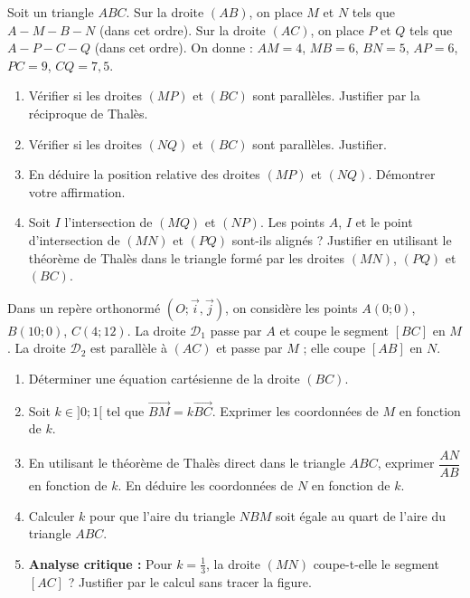 \documentclass[11pt]{article}
\begin{document}
\begin{exercice}
Soit un triangle $ABC$. Sur la droite $(AB)$, on place $M$ et $N$ tels que $A-M-B-N$ (dans cet ordre). Sur la droite $(AC)$, on place $P$ et $Q$ tels que $A-P-C-Q$ (dans cet ordre).
On donne : $AM = 4$, $MB = 6$, $BN = 5$, $AP = 6$, $PC = 9$, $CQ = 7,5$.
\begin{enumerate}
    \item Vérifier si les droites $(MP)$ et $(BC)$ sont parallèles. Justifier par la réciproque de Thalès.
    \item Vérifier si les droites $(NQ)$ et $(BC)$ sont parallèles. Justifier.
    \item En déduire la position relative des droites $(MP)$ et $(NQ)$. Démontrer votre affirmation.
    \item Soit $I$ l'intersection de $(MQ)$ et $(NP)$. Les points $A$, $I$ et le point d'intersection de $(MN)$ et $(PQ)$ sont-ils alignés ? Justifier en utilisant le théorème de Thalès dans le triangle formé par les droites $(MN)$, $(PQ)$ et $(BC)$.
\end{enumerate}
\end{exercice}

\begin{exercice}
Dans un repère orthonormé $(O; \vec{i}, \vec{j})$, on considère les points $A(0;0)$, $B(10;0)$, $C(4;12)$.
La droite $\mathcal{D}_1$ passe par $A$ et coupe le segment $[BC]$ en $M$. La droite $\mathcal{D}_2$ est parallèle à $(AC)$ et passe par $M$ ; elle coupe $[AB]$ en $N$.
\begin{enumerate}
    \item Déterminer une équation cartésienne de la droite $(BC)$.
    \item Soit $k \in ]0;1[$ tel que $\overrightarrow{BM} = k \overrightarrow{BC}$. Exprimer les coordonnées de $M$ en fonction de $k$.
    \item En utilisant le théorème de Thalès direct dans le triangle $ABC$, exprimer $\dfrac{AN}{AB}$ en fonction de $k$. En déduire les coordonnées de $N$ en fonction de $k$.
    \item Calculer $k$ pour que l'aire du triangle $NBM$ soit égale au quart de l'aire du triangle $ABC$.
    \item \textbf{Analyse critique :} Pour $k = \frac{1}{3}$, la droite $(MN)$ coupe-t-elle le segment $[AC]$ ? Justifier par le calcul sans tracer la figure.
\end{enumerate}
\end{exercice}
\end{document}
